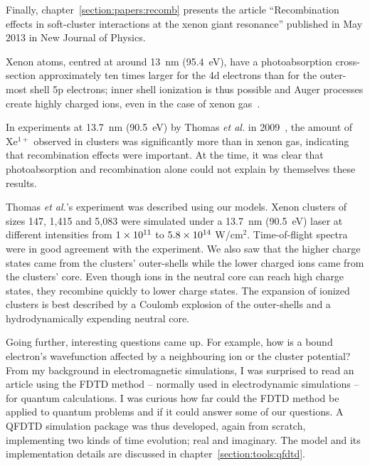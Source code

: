 
Finally, chapter~\ref{section:papers:recomb} presents the article ``Recombination
effects in soft-\xray cluster interactions at the xenon giant resonance''
published in May 2013 in New Journal of Physics.

Xenon atoms, centred at around 13~nm (95.4~eV), have a photoabsorption
cross-section approximately ten times larger for the 4d electrons than for the
outer-most shell 5p electrons; inner shell ionization is thus possible and
Auger processes create highly charged ions, even in the case of xenon
gas~\cite{Uiberacker2007}.

In experiments at 13.7~nm (90.5~eV) by Thomas \textit{et al.} in
2009~\cite{Thomas2009}, the amount of Xe$^{1+}$ observed in clusters was
significantly more than in xenon gas, indicating that recombination effects were
important. At the time, it was clear that photoabsorption and recombination alone
could not explain by themselves these results.

Thomas \textit{et al.}'s experiment was described using our models. Xenon
clusters of sizes 147, 1,415 and 5,083 were simulated under a 13.7~nm
(90.5~eV) laser at different intensities from $\ten{1}{11}$ to
$\ten{5.8}{14}$ W/cm$^2$. Time-of-flight spectra were in good agreement with the
experiment. We also saw that the higher charge states came from the clusters'
outer-shells while the lower charged ions came from the clusters' core. Even
though ions in the neutral core can reach high charge states, they recombine
quickly to lower charge states. The expansion of ionized clusters is best
described by a Coulomb explosion of the outer-shells and a hydrodynamically
expending neutral core.




Going further, interesting questions came up. For example, how is a bound
electron's wavefunction affected by a neighbouring ion or the cluster potential?
From my background in electromagnetic simulations, I was surprised to read
an article using the FDTD method -- normally used in electrodynamic simulations --
for quantum calculations. I was curious how far could the FDTD method be
applied to quantum problems and if it could answer some of our questions.
A QFDTD simulation package was thus developed, again from scratch,  implementing
two kinds of time evolution; real and imaginary. The model and its implementation details
are discussed in chapter~\ref{section:tools:qfdtd}.

